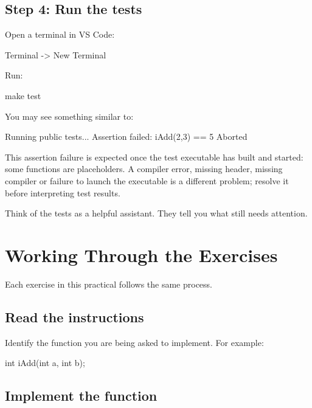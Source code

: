 \documentclass{csc2059practical}
\begin{document}
\subsection{Step 4: Run the tests}

Open a terminal in VS Code:

\begin{terminal}
Terminal -> New Terminal
\end{terminal}

Run:

\begin{bashcode}
make test
\end{bashcode}

You may see something similar to:

\begin{terminal}
Running public tests...
Assertion failed:
iAdd(2,3) == 5
Aborted
\end{terminal}

This assertion failure is expected once the test executable has built and started: some functions are placeholders. A compiler error, missing header, missing compiler or failure to launch the executable is a different problem; resolve it before interpreting test results.

\begin{tipbox}
Think of the tests as a helpful assistant. They tell you what still needs attention.
\end{tipbox}

\section{Working Through the Exercises}

Each exercise in this practical follows the same process.

\subsection{Read the instructions}

Identify the function you are being asked to implement. For example:

\begin{cppcode}
int iAdd(int a, int b);
\end{cppcode}

\subsection{Implement the function}
\end{document}
